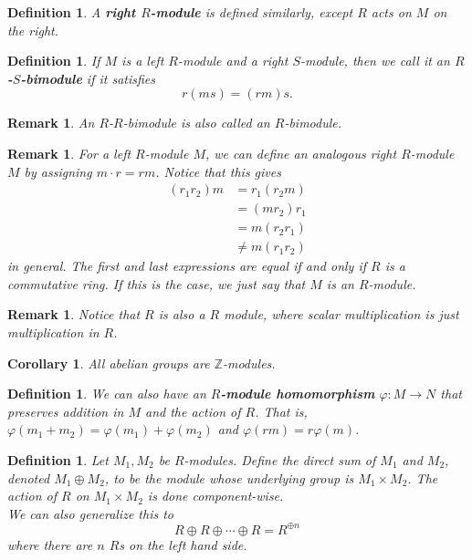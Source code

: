 \documentclass{article}
\theoremstyle{norm}
\newtheorem{df}[thm]{Definition}
\newtheorem{rem}[thm]{Remark}
\newtheorem{cor}[thm]{Corollary}
\begin{document}
\begin{df}
A \textbf{right $R$-module} is defined similarly, except $R$ acts on $M$
on the right.
\end{df}

\begin{df}
If $M$ is a left $R$-module and a right $S$-module, then we call it an
\textbf{$R$-$S$-bimodule} if it satisfies
\[ r\left(ms\right) = \left(rm\right)s. \]
\end{df}
\begin{rem}
An $R$-$R$-bimodule is also called an $R$-bimodule.
\end{rem}

\begin{rem}
For a left $R$-module $M$, we can define an analogous right $R$-module
$M$ by assigning $m \cdot r = rm$. Notice that this gives
\[ \begin{aligned}
\left(r_1 r_2\right) m &= r_1 \left(r_2 m\right) \\
&= \left(m r_2\right) r_1 \\
&= m \left(r_2 r_1\right) \\
&\neq m \left(r_1 r_2\right)
\end{aligned} \]
in general. The first and last expressions are equal if and only if $R$
is a commutative ring. If this is the case, we just say that $M$ is an
$R$-module.
\end{rem}
\begin{rem}
Notice that $R$ is also a $R$ module, where scalar multiplication is
just multiplication in $R$.
\end{rem}

\begin{cor}
All abelian groups are $\mathbb{Z}$-modules.
\end{cor}

\begin{df}
We can also have an \textbf{$R$-module homomorphism} $\varphi : M
\rightarrow N$ that preserves addition in $M$ and the action of $R$.
That is, $\varphi(m_1 + m_2) = \varphi(m_1) + \varphi(m_2)$ and
$\varphi(rm) = r \varphi(m)$.
\end{df}

\begin{df}
Let $M_1, M_2$ be $R$-modules. Define the direct sum of $M_1$ and $M_2$,
denoted $M_1 \oplus M_2$, to be the module whose underlying group is
$M_1 \times M_2$. The action of $R$ on $M_1 \times M_2$ is done
component-wise. \\
We can also generalize this to
\[ R \oplus R \oplus \cdots \oplus R = R^{\oplus n} \]
where there are $n$ $R$s on the left hand side.
\end{df}
\end{document}
